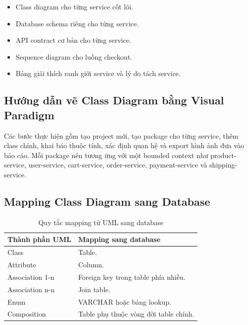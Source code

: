\documentclass[../main.tex]{subfiles}
\begin{document}
\begin{itemize}
    \item Class diagram cho từng service cốt lõi.
    \item Database schema riêng cho từng service.
    \item API contract cơ bản cho từng service.
    \item Sequence diagram cho luồng checkout.
    \item Bảng giải thích ranh giới service và lý do tách service.
\end{itemize}

\subsection{Hướng dẫn vẽ Class Diagram bằng Visual Paradigm}
\label{subsection:2.10.2}

Các bước thực hiện gồm tạo project mới, tạo package cho từng service, thêm class chính, khai báo thuộc tính, xác định quan hệ và export hình ảnh đưa vào báo cáo. Mỗi package nên tương ứng với một bounded context như product-service, user-service, cart-service, order-service, payment-service và shipping-service.

\subsection{Mapping Class Diagram sang Database}
\label{subsection:2.10.3}

\begin{table}[H]
    \centering
    \caption{Quy tắc mapping từ UML sang database}
    \label{tab:chapter2-uml-db-mapping}
    \begin{tabular}{|p{}|p{}|}
        \hline
        \rowcolor{primary!35}
        \textbf{Thành phần UML} & \textbf{Mapping sang database} \\
        \hline
        Class & Table. \\
        \hline
        Attribute & Column. \\
        \hline
        Association 1-n & Foreign key trong table phía nhiều. \\
        \hline
        Association n-n & Join table. \\
        \hline
        Enum & VARCHAR hoặc bảng lookup. \\
        \hline
        Composition & Table phụ thuộc vòng đời table chính. \\
        \hline
    \end{tabular}
\end{table}
\end{document}
